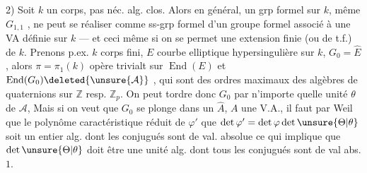 
2) Soit $k$ un corps, pas néc. alg. clos. Alors en général, un grp formel  sur $k$, même  $G_{1,1}$ , ne peut se réaliser comme ss-grp formel d'un groupe formel associé à une VA définie sur $k$ --- et ceci même si on se permet une extension finie  (ou de t.f.) de $k$. Prenons p.ex. $k$ corps fini, $E$ courbe elliptique hypersingulière sur $k$,   $G_0=\widehat E$, alors $\pi=\pi_1(k)$ opère trivialt sur $\operatorname{End}(E)$ et $\operatorname{End}(G_0)\deleted{\unsure{\mathcal A}}$ , qui sont des   ordres maximaux des algèbres de quaternions sur $\mathbb Z$ resp. $\mathbb Z_p$. On peut tordre donc $G_0$ par n'importe quelle unité $\theta$ de $\mathcal A$,   Mais si on veut que $G_0$ se plonge dans un $\widehat A$, $A$ une V.A., il faut par Weil que le polynôme caractéristique réduit de $\varphi'$ \inserted{$=\unsure{\Theta|\theta}\varphi$}      que $\det\varphi'=\det\varphi\det\unsure{\Theta|\theta}$  soit un entier alg. dont  les conjugués sont de val. absolue \unsure{,} ce qui implique que $\det\unsure{\Theta|\theta}$ doit être une unité alg. dont tous les conjugués sont de val abs. $1$.

